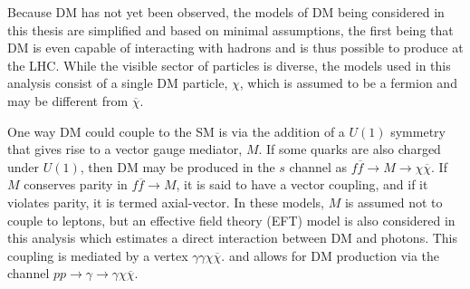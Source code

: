   Because DM has not yet been observed, 
   the models of DM being considered in this thesis are
   simplified and based on minimal assumptions,
   the first being that DM is even capable of interacting
   with hadrons and is thus possible to produce
   at the LHC.
  While the visible sector of particles is diverse,
   the models used in this analysis
   consist of a single DM particle,
   $\chi$, which is assumed to be a fermion
   and may be different from $\overline{\chi}$.

  One way DM could couple to the SM is via the
   addition of a $U(1)$ symmetry that
   gives rise to a vector gauge mediator, $M$.
  If some quarks are also charged under
   $U(1)$, then DM may be produced in the
   $s$ channel as
   $f\overline{f}\rightarrow M\rightarrow\chi\overline{\chi}$.
  If $M$ conserves parity in $f\overline{f}\rightarrow M$,
   it is said to have a vector coupling,
   and if it violates parity, it is
   termed axial-vector.
  In these models, $M$ is assumed not
   to couple to leptons, but
   an effective field theory (EFT)
   model is also considered in this analysis
   which estimates a direct interaction
   between DM and photons. 
  This coupling is mediated by a vertex
   $\gamma\gamma\chi\overline{\chi}$.
   and allows for DM production via
   the channel
   $pp\rightarrow\gamma\rightarrow\gamma\chi\overline{\chi}$.


